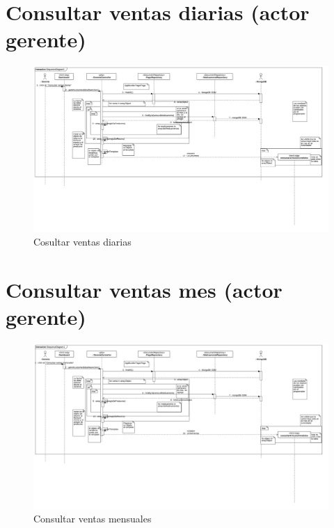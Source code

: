 \section{Consultar ventas diarias (actor gerente)}
\begin{figure}[htbp!]
		\centering
			\includegraphics[width=1\textwidth]{uml/DiagramasSecuencia/RubenMurga/getVentasDia}
		\caption{Cosultar ventas diarias}
	\end{figure}
\newpage
\section{Consultar ventas mes (actor gerente)}
\begin{figure}[htbp!]
		\centering
			\includegraphics[width=1\textwidth]{uml/DiagramasSecuencia/RubenMurga/getVentasMes}
		\caption{Consultar ventas mensuales}
	\end{figure}
\newpage
